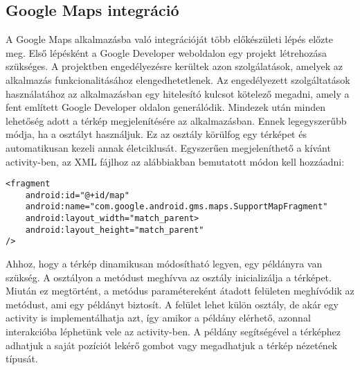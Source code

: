 \subsection*{Google Maps integráció}
\label{googlemaps}
A Google Maps alkalmazásba való integrációját több előkészületi lépés előzte meg.
Első lépésként a Google Developer weboldalon egy projekt létrehozása szükséges.
A projektben engedélyezésre kerültek azon szolgálatások, amelyek az alkalmazás funkcionalitásához elengedhetetlenek.
Az engedélyezett szolgáltatások használatához az alkalmazásban egy hitelesító kulcsot kötelező megadni, amely a fent említett Google Developer oldalon generálódik. 
Mindezek után minden lehetőség adott a térkép megjelenítésére az alkalmazásban.
Ennek legegyszerűbb módja, ha a  osztályt használjuk.
Ez az osztály körülfog egy térképet és automatikusan kezeli annak életciklusát.
Egyszerűen megjeleníthető a kívánt activity-ben, az XML fájlhoz az alábbiakban bemutatott módon kell hozzáadni:
\begin{lstlisting}
<fragment
	android:id="@+id/map"
	android:name="com.google.android.gms.maps.SupportMapFragment"
	android:layout_width="match_parent>
	android:layout_height="match_parent"
/>
\end{lstlisting}

Ahhoz, hogy a térkép dinamikusan módosítható legyen, egy  példányra van szükség.
A  osztályon a  metódust meghívva az osztály inicializálja a térképet.
Miután ez megtörtént, a metódus paramétereként átadott  felületen meghívódik az  metódust, ami egy  példányt biztosít.
A  felület lehet külön osztály, de akár egy activity is implementálhatja azt, így amikor a példány elérhető, azonnal interakcióba léphetünk vele az activity-ben.
A  példány segítségével a térképhez adhatjuk a saját pozíciót lekérő gombot vagy megadhatjuk a térkép nézetének típusát.

